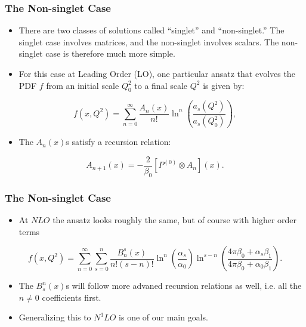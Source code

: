 \documentclass{beamer}
\begin{document}
\begin{frame}
  \frametitle{The Non-singlet Case}

  \begin{itemize}
  \item There are two classes of solutions called ``singlet'' and ``non-singlet.'' The singlet case involves matrices, and the non-singlet involves scalars. The non-singlet case is therefore much more simple.
  \item For this case at Leading Order (LO), one particular ansatz that evolves the PDF $f$ from an initial scale $Q_0^2$ to a final scale $Q^2$ is given by:
  \end{itemize}

  \begin{equation}
    f(x, Q^2) = \sum_{n=0}^{\infty} \frac{A_n(x)}{n!} \ln^n\left( \frac{a_s(Q^2)}{a_s(Q_0^2)} \right),
  \end{equation}

  \begin{itemize}
  \item The $A_n(x)$s satisfy a recursion relation:
  \end{itemize}

  \begin{equation}
    A_{n+1}(x) = - \frac{2}{\beta_0}[P^{(0)} \otimes A_n] (x).
  \end{equation}
\end{frame}


\begin{frame}
  \frametitle{The Non-singlet Case}

  \begin{itemize}
  \item At $NLO$ the ansatz looks roughly the same, but of course with higher order terms 
  \end{itemize}

  \begin{equation}
    f(x, Q^2) = \sum_{n=0}^{\infty}\sum_{s=0}^n \frac{B_n^s(x)}{n!(s-n)!} \ln^n \left( \frac{\alpha_s}{\alpha_0} \right) \ln^{s-n}\left( \frac{4\pi\beta_0 + \alpha_s\beta_1}{4\pi\beta_0 + \alpha_0\beta_1} \right).
  \end{equation}

  \begin{itemize}
  \item The $B_s^n(x)$s will follow more advaned recursion relations as well, i.e. all the $n\neq0$ coefficients first.
  \item Generalizing this to $N^3LO$ is one of our main goals.
  \end{itemize}
\end{frame}
\end{document}
